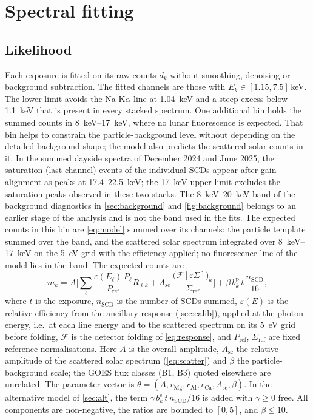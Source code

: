 \section{Spectral fitting}\label{sec:fitting}

\subsection{Likelihood}\label{sec:likelihood}
Each exposure is fitted on its raw counts $d_k$ without smoothing, denoising or background subtraction. The fitted channels are those with $E_k\in[1.15,7.5]$\,keV. The lower limit avoids the Na K$\alpha$ line at \SI{1.04}{keV} and a steep excess below \SI{1.1}{keV} that is present in every stacked spectrum. One additional bin holds the summed counts in \SIrange{8}{17}{keV}, where no lunar fluorescence is expected. That bin helps to constrain the particle-background level without depending on the detailed background shape; the model also predicts the scattered solar counts in it. In the summed dayside spectra of December 2024 and June 2025, the saturation (last-channel) events of the individual SCDs appear after gain alignment as peaks at 17.4--\SI{22.5}{keV}; the \SI{17}{keV} upper limit excludes the saturation peaks observed in these two stacks. The \SIrange{8}{20}{keV} band of the background diagnostics in \cref{sec:background} and \cref{fig:background} belongs to an earlier stage of the analysis and is not the band used in the fits. The expected counts in this bin are \cref{eq:model} summed over its channels: the particle template summed over the band, and the scattered solar spectrum integrated over \SIrange{8}{17}{keV} on the \SI{5}{eV} grid with the efficiency applied; no fluorescence line of the model lies in the band. The expected counts are
\begin{equation}
m_k = A\Big[\sum_\ell \frac{\varepsilon(E_\ell)\,P_\ell}{P_\mathrm{ref}} R_{\ell k} + A_\mathrm{sc}\,\frac{\big(\mathcal{F}[\varepsilon\Sigma]\big)_k}{\Sigma_\mathrm{ref}}\Big]
+ \beta\,b^{\mathrm{p}}_k\,t\,\frac{n_\mathrm{SCD}}{16},
\label{eq:model}
\end{equation}
where $t$ is the exposure, $n_\mathrm{SCD}$ is the number of SCDs summed, $\varepsilon(E)$ is the relative efficiency from the ancillary response (\cref{sec:calib}), applied at the photon energy, i.e.\ at each line energy and to the scattered spectrum on its \SI{5}{eV} grid before folding, $\mathcal{F}$ is the detector folding of \cref{eq:response}, and $P_\mathrm{ref}$, $\Sigma_\mathrm{ref}$ are fixed reference normalisations. Here $A$ is the overall amplitude, $A_\mathrm{sc}$ the relative amplitude of the scattered solar spectrum (\cref{eq:scatter}) and $\beta$ the particle-background scale; the GOES flux classes (B1, B3) quoted elsewhere are unrelated. The parameter vector is $\theta=(A,r_\mathrm{Mg},r_\mathrm{Al},r_\mathrm{Ca},A_\mathrm{sc},\beta)$. In the alternative model of \cref{sec:alt}, the term $\gamma\,b^{\mathrm{s}}_k\,t\,n_\mathrm{SCD}/16$ is added with $\gamma\ge0$ free. All components are non-negative, the ratios are bounded to $[0,5]$, and $\beta\le10$.

